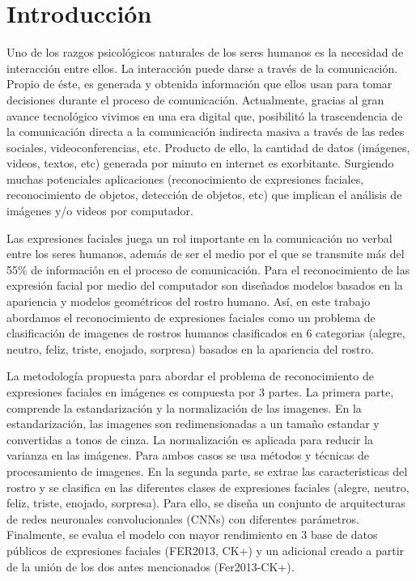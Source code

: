\chapter*{Introducción}
Uno de los razgos psicológicos naturales de los seres humanos es la necesidad de interacción entre ellos. La interacción puede darse a través de la comunicación. Propio de éste, es generada y obtenida información que ellos usan para tomar decisiones durante el proceso de comunicación. Actualmente, gracias al gran avance tecnológico vivimos en una era digital que, posibilitó la trascendencia de la comunicación directa a la comunicación indirecta masiva a través de las redes sociales, videoconferencias, etc. Producto de ello, la cantidad de datos (imágenes, videos, textos, etc) generada por minuto en internet es exorbitante. Surgiendo muchas potenciales aplicaciones (reconocimiento de expresiones faciales, reconocimiento de objetos, detección de objetos, etc) que implican el análisis de imágenes y/o videos por computador. 

Las expresiones faciales juega un rol importante en la comunicación no verbal entre los seres humanos, además de ser el medio por el que se transmite más del 55\% de información en el proceso  de comunicación. Para el reconocimiento de las expresión facial por medio del computador son diseñados modelos basados en la apariencia y modelos geométricos del rostro humano.
Así, en este trabajo abordamos el reconocimiento de expresiones faciales como un problema de clasificación de imagenes de rostros humanos clasificados en 6 categorias (alegre, neutro, feliz, triste, enojado, sorpresa) basados en la apariencia del rostro.

La metodología propuesta  para abordar el problema de reconocimiento de expresiones faciales en imágenes es compuesta por 3 partes. La primera parte, comprende la estandarización y la normalización de las imagenes. En la estandarización, las imagenes son redimensionadas a un tamaño estandar y convertidas a tonos de cinza. La normalización es aplicada para reducir la varianza en las imágenes. Para ambos casos se usa métodos y técnicas de procesamiento de imagenes. En la segunda parte, se extrae las caracteristicas del rostro y se clasifica en las diferentes clases de expresiones faciales (alegre, neutro, feliz, triste, enojado, sorpresa). Para ello, se diseña un conjunto de arquitecturas de redes neuronales convolucionales (CNNs) con diferentes parámetros. Finalmente, se evalua el modelo con mayor rendimiento en 3 base de datos públicos de expresiones faciales (FER2013, CK+) y un adicional creado a partir de la unión de los dos antes mencionados (Fer2013-CK+). 

